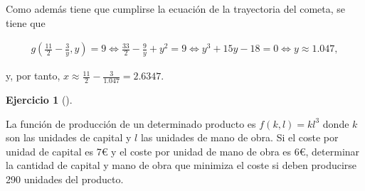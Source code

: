 \documentclass[
  spanish,
  a4paper,
]{scrreport}
\theoremstyle{definition}
\newtheorem{exercise}{Ejercicio}[chapter]
\theoremstyle{remark}
\begin{document}
\begin{tcolorbox}
Como además tiene que cumplirse la ecuación de la trayectoria del
cometa, se tiene que

\[
\begin{gathered}
g\left(\frac{11}{2}-\frac{3}{y},y\right) = 9 
\Leftrightarrow \frac{33}{2}-\frac{9}{y}+y^2 = 9
\Leftrightarrow y^3+15y-18 = 0 
\Leftrightarrow y \approx 1.047,
\end{gathered}
\]

y, por tanto, \(x\approx \frac{11}{2}-\frac{3}{1.047}= 2.6347.\)

\end{tcolorbox}

\begin{exercise}[]\protect\hypertarget{exr-minimizacion-coste-production}{}\label{exr-minimizacion-coste-production}

La función de producción de un determinado producto es \(f(k,l)= kl^3\)
donde \(k\) son las unidades de capital y \(l\) las unidades de mano de
obra. Si el coste por unidad de capital es 7€ y el coste por unidad de
mano de obra es 6€, determinar la cantidad de capital y mano de obra que
minimiza el coste si deben producirse 290 unidades del producto.

\end{exercise}
\end{document}
